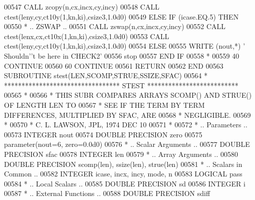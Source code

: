 \begin{DoxyCode}
00547                \textcolor{keyword}{CALL }zcopy(n,cx,incx,cy,incy)
00548                \textcolor{keyword}{CALL }ctest(leny,cy,ct10y(1,kn,ki),csize3,1.0d0)
00549             \textcolor{keywordflow}{ELSE} \textcolor{keywordflow}{IF} (icase.EQ.5) \textcolor{keywordflow}{THEN}
00550 \textcolor{comment}{*              .. ZSWAP ..}
00551                \textcolor{keyword}{CALL }zswap(n,cx,incx,cy,incy)
00552                \textcolor{keyword}{CALL }ctest(lenx,cx,ct10x(1,kn,ki),csize3,1.0d0)
00553                \textcolor{keyword}{CALL }ctest(leny,cy,ct10y(1,kn,ki),csize3,1.0d0)
00554             \textcolor{keywordflow}{ELSE}
00555                \textcolor{keyword}{WRITE} (nout,*) \textcolor{stringliteral}{' Shouldn'}\textcolor{stringliteral}{'t be here in CHECK2'}
00556                stop
00557 \textcolor{keywordflow}{            END IF}
00558 \textcolor{comment}{*}
00559    40    \textcolor{keywordflow}{CONTINUE}
00560    60 \textcolor{keywordflow}{CONTINUE}
00561       \textcolor{keywordflow}{RETURN}
00562 \textcolor{keyword}{      END}
00563 \textcolor{keyword}{      SUBROUTINE }stest(LEN,SCOMP,STRUE,SSIZE,SFAC)
00564 \textcolor{comment}{*     ********************************* STEST **************************}
00565 \textcolor{comment}{*}
00566 \textcolor{comment}{*     THIS SUBR COMPARES ARRAYS  SCOMP() AND STRUE() OF LENGTH LEN TO}
00567 \textcolor{comment}{*     SEE IF THE TERM BY TERM DIFFERENCES, MULTIPLIED BY SFAC, ARE}
00568 \textcolor{comment}{*     NEGLIGIBLE.}
00569 \textcolor{comment}{*}
00570 \textcolor{comment}{*     C. L. LAWSON, JPL, 1974 DEC 10}
00571 \textcolor{comment}{*}
00572 \textcolor{comment}{*     .. Parameters ..}
00573       \textcolor{keywordtype}{INTEGER}          nout
00574       \textcolor{keywordtype}{DOUBLE PRECISION} zero
00575       parameter(nout=6, zero=0.0d0)
00576 \textcolor{comment}{*     .. Scalar Arguments ..}
00577       \textcolor{keywordtype}{DOUBLE PRECISION} sfac
00578       \textcolor{keywordtype}{INTEGER}          len
00579 \textcolor{comment}{*     .. Array Arguments ..}
00580       \textcolor{keywordtype}{DOUBLE PRECISION} scomp(len), ssize(len), strue(len)
00581 \textcolor{comment}{*     .. Scalars in Common ..}
00582       \textcolor{keywordtype}{INTEGER}          icase, incx, incy, mode, n
00583       \textcolor{keywordtype}{LOGICAL}          pass
00584 \textcolor{comment}{*     .. Local Scalars ..}
00585       \textcolor{keywordtype}{DOUBLE PRECISION} sd
00586       \textcolor{keywordtype}{INTEGER}          i
00587 \textcolor{comment}{*     .. External Functions ..}
00588       \textcolor{keywordtype}{DOUBLE PRECISION} sdiff

\end{DoxyCode}
